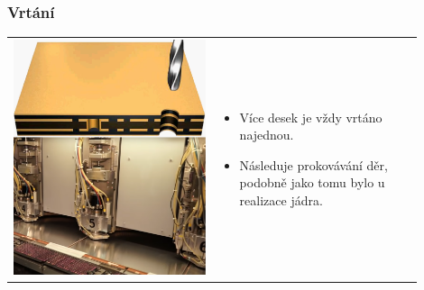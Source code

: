 \documentclass{beamer}
\begin{document}
\begin{frame}
	\frametitle{Vrtání}

	\begin{center}
		\begin{tabular}{m{0.45\linewidth} m{0.45\linewidth}}
		 \includegraphics[scale=0.15]{vnejsiVrtani.png} &
			
			\begin{itemize}
				\item Více desek je vždy vrtáno najednou.
				\item Následuje prokovávání děr, podobně jako tomu bylo u realizace jádra.
			\end{itemize}
		\end{tabular}
	\end{center}
\end{frame}
\end{document}
